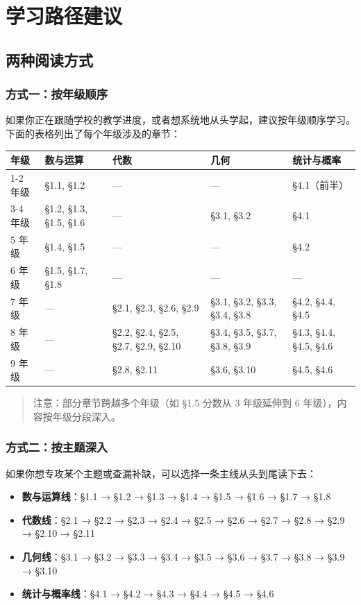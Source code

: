 \chapter*{学习路径建议}


\section*{两种阅读方式}


\subsection*{方式一：按年级顺序}


如果你正在跟随学校的教学进度，或者想系统地从头学起，建议按年级顺序学习。下面的表格列出了每个年级涉及的章节：

\begin{center}
\begin{tabular}{lllll}
\toprule
年级 & 数与运算 & 代数 & 几何 & 统计与概率 \\
\midrule
1-2 年级 & §1.1, §1.2 & — & — & §4.1（前半） \\
3-4 年级 & §1.2, §1.3, §1.5, §1.6 & — & §3.1, §3.2 & §4.1 \\
5 年级 & §1.4, §1.5 & — & — & §4.2 \\
6 年级 & §1.5, §1.7, §1.8 & — & — & — \\
7 年级 & — & §2.1, §2.3, §2.6, §2.9 & §3.1, §3.2, §3.3, §3.4, §3.8 & §4.2, §4.4, §4.5 \\
8 年级 & — & §2.2, §2.4, §2.5, §2.7, §2.9, §2.10 & §3.4, §3.5, §3.7, §3.8, §3.9 & §4.3, §4.4, §4.5, §4.6 \\
9 年级 & — & §2.8, §2.11 & §3.6, §3.10 & §4.5, §4.6 \\
\bottomrule
\end{tabular}
\end{center}


\begin{quote}
注意：部分章节跨越多个年级（如 §1.5 分数从 3 年级延伸到 6 年级），内容按年级分段深入。
\end{quote}


\subsection*{方式二：按主题深入}


如果你想专攻某个主题或查漏补缺，可以选择一条主线从头到尾读下去：

\begin{itemize}
  \item \textbf{数与运算线}：§1.1 → §1.2 → §1.3 → §1.4 → §1.5 → §1.6 → §1.7 → §1.8
  \item \textbf{代数线}：§2.1 → §2.2 → §2.3 → §2.4 → §2.5 → §2.6 → §2.7 → §2.8 → §2.9 → §2.10 → §2.11
  \item \textbf{几何线}：§3.1 → §3.2 → §3.3 → §3.4 → §3.5 → §3.6 → §3.7 → §3.8 → §3.9 → §3.10
  \item \textbf{统计与概率线}：§4.1 → §4.2 → §4.3 → §4.4 → §4.5 → §4.6
\end{itemize}


